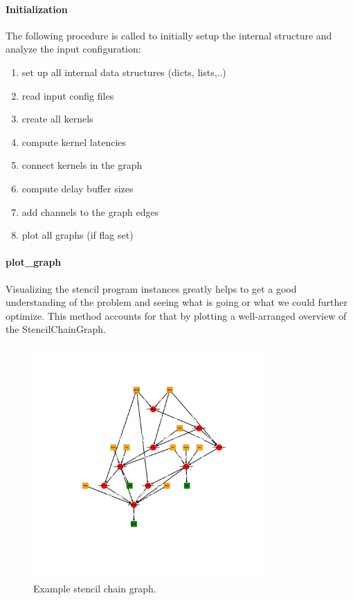 \paragraph{Initialization}
The following procedure is called to initially setup the internal structure and analyze the input configuration:
\begin{enumerate}
	\item set up all internal data structures (dicts, lists,..)
	\item read input config files
	\item create all kernels
	\item compute kernel latencies
	\item connect kernels in the graph
	\item compute delay buffer sizes
	\item add channels to the graph edges
	\item plot all graphs (if flag set)
\end{enumerate}

\paragraph{plot\_graph}
Visualizing the stencil program instances greatly helps to get a good understanding of the problem and seeing what is going or what we could further optimize. This method accounts for that by plotting a well-arranged overview of the StencilChainGraph. 
\begin{figure}[h]
	\centering
	\includegraphics[height=24em]{images/fastwaves.png}
	\caption{Example stencil chain graph.}
	\label{fig:fastwaves}
\end{figure}


